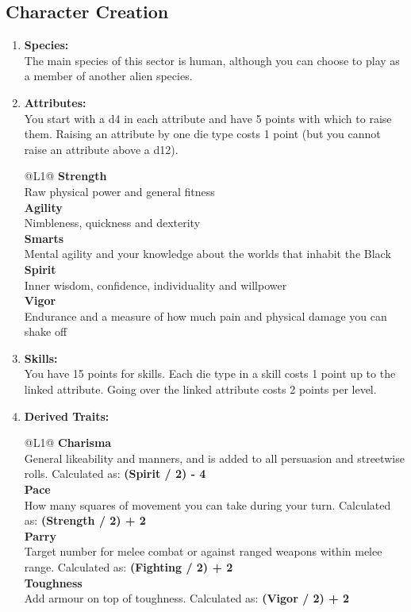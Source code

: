 \subsection{Character Creation}
\label{sec:rules-creation}

\begin{enumerate}

  \item \textbf{Species:}\\ The main species of this sector is human, although you can choose to play as a member of another alien species.
  
  \item \textbf{Attributes:}\\ You start with a d4 in each attribute and have 5 points with which to raise them. Raising an attribute by one die type costs 1 point (but you cannot raise an attribute above a d12).
    \begin{redtable}{\linewidth}{@{}L{1}@{}}
      \textbf{Strength}\\
      Raw physical power and general fitness\\
      \textbf{Agility}\\
      Nimbleness, quickness and dexterity\\
      \textbf{Smarts}\\
      Mental agility and your knowledge about the worlds that inhabit the Black\\
      \textbf{Spirit}\\
      Inner wisdom, confidence, individuality and willpower\\
      \textbf{Vigor}\\
      Endurance and a measure of how much pain and physical damage you can shake off
    \end{redtable}

  \item \textbf{Skills:}\\ You have 15 points for skills. Each die type in a skill costs 1 point up to the linked attribute. Going over the linked attribute costs 2 points per level.

  \item \textbf{Derived Traits:}\\
    \begin{redtable}{\linewidth}{@{}L{1}@{}}
      \textbf{Charisma}\\
      General likeability and manners, and is added to all persuasion and streetwise rolls. Calculated as: \textbf{(Spirit / 2) - 4}\\
      \textbf{Pace}\\
      How many squares of movement you can take during your turn. Calculated as: \textbf{(Strength / 2) + 2}\\
      \textbf{Parry}\\
      Target number for melee combat or against ranged weapons within melee range. Calculated as: \textbf{(Fighting / 2) + 2}\\
      \textbf{Toughness}\\
      Add armour on top of toughness. Calculated as: \textbf{(Vigor / 2) + 2}\\
    \end{redtable}


\end{enumerate}
